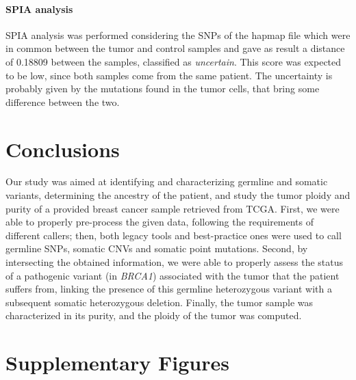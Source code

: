 \documentclass[11pt]{article}
\begin{document}
\paragraph{SPIA analysis}

SPIA analysis was performed considering the SNPs of the hapmap file which were in common between the tumor and control samples and gave as result a distance of 0.18809 between the samples, classified as \textit{uncertain}. This score was expected to be low, since both samples come from the same patient. The uncertainty is probably given by the mutations found in the tumor cells, that bring some difference between the two.


\section*{Conclusions}

Our study was aimed at identifying and characterizing germline and somatic variants, determining the ancestry of the patient, and study the tumor ploidy and purity of a provided breast cancer sample retrieved from TCGA. 
First, we were able to properly pre-process the given data, following the requirements of different callers; then, both legacy tools and best-practice ones were used to call germline SNPs, somatic CNVs and somatic point mutations. Second, by intersecting the obtained information, we were able to properly assess the status of a pathogenic variant (in \emph{BRCA1}) associated with the tumor that the patient suffers from, linking the presence of this germline heterozygous variant with a subsequent somatic heterozygous deletion. Finally, the tumor sample was characterized in its purity, and the ploidy of the tumor was computed.








\clearpage

\appendix
\renewcommand{\thefigure}{S\arabic{figure}}
\setcounter{figure}{0}


\section*{Supplementary Figures}
\end{document}
